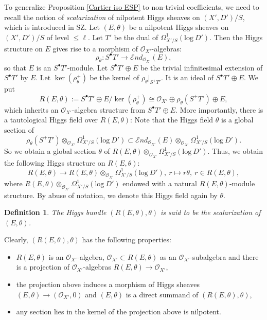 \documentclass[12pt, a4paper]{article}
\newtheorem{definition}{Definition}[section]
\begin{document}
To generalize Proposition \ref{Cartier iso ESP} to non-trivial coefficients, we need to recall the notion of {\itshape scalarization} of nilpotent Higgs sheaves on $(X',D')/S$, which is introduced in SZ. Let $(E,\theta)$ be a nilpotent Higgs sheaves on $(X',D')/S$ of level $\leq \ell$. Let $T'$ be the dual of $\Omega^1_{X'/S}(\mathrm{log}~D')$. Then the Higgs structure on  $E$ gives rise to a morphism of $\mathcal O_{X'}$-algebras:
$$
\rho_\theta:S^\bullet T'\to\mathcal End_{\mathcal O_{X'}}(E),
$$
so that $E$ is an $S^\bullet T'$-module. Let $S^\bullet T'\oplus E$ be the trivial infinitesimal extension of $S^\bullet T'$ by $E$. Let $\ker(\rho^+_{\theta})$ be the kernel of $\rho_{\theta}|_{S^+ T'}$. It is an ideal of $S^\bullet T'\oplus E$. We put
$$
R(E,\theta):=S^\bullet T'\oplus E/\ker(\rho^+_{\theta})\cong \mathcal O_{X'}\oplus\rho_\theta(S^+ T')\oplus E,
$$
which inherits an $\mathcal O_{X'}$-algebra structure from $S^\bullet T'\oplus E$. More importantly, there is a tautological Higgs field over $R(E,\theta)$: Note that the Higgs field $\theta$ is a global section of
$$
\rho_\theta(S^+ T') \otimes_{\mathcal O_{X'}}\Omega^1_{X'/S}(\mathrm{log}~D') \subset\mathcal End_{\mathcal O_{X'}}(E)\otimes_{\mathcal O_{X'}}\Omega^1_{X'/S}(\mathrm{log}~D').
$$
So we obtain a global section $\theta$ of $R(E,\theta)\otimes_{\mathcal O_{X'}}\Omega^1_{X'/S}(\mathrm{log}~D')$.
Thus, we obtain the following Higgs structure on $R(E,\theta)$:
$$
R(E,\theta)\to R(E,\theta)\otimes_{\mathcal O_{X'}}\Omega^1_{X'/S}(\mathrm{log}~D'),~r\mapsto r\theta,~r\in R(E,\theta),
$$
where $R(E,\theta)\otimes_{\mathcal O_{X'}}\Omega^1_{X'/S}(\mathrm{log}~D')$ endowed with a natural $R(E,\theta)$-module structure.  By abuse of notation, we denote this Higgs field again by $\theta$. 
\begin{definition}
The Higgs bundle $(R(E,\theta),\theta)$ is said to be the scalarization of $(E,\theta)$.
\end{definition}
Clearly, $(R(E,\theta),\theta)$ has the following properties:
\begin{itemize}
	\item[(i)\ ] $R(E,\theta)$ is an $\mathcal O_{X'}$-algebra, $\mathcal O_{X'}\subset R(E,\theta)$ as an $\mathcal O_{X'}$-subalgebra and there is a projection of $\mathcal O_{X'}$-algebras $R(E,\theta)\to \mathcal O_{X'}$,
		\item[(ii)\ ] the projection above induces a morphism of Higgs sheaves $(E,\theta)\to (\mathcal O_{X'},0)$ and $(E,\theta)$ is a direct summand of $(R(E,\theta),\theta)$,
	\item[(iii)\ ] any section lies in the kernel of the projection above is nilpotent.\end{itemize}
\end{document}
